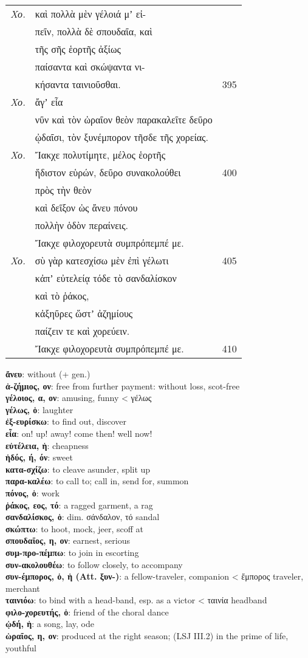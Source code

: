 \documentclass[13pt]{article}
\newcommand{\vocabentry}[2]{\textbf{#1}: #2\vspace{0.0em}\\}
\begin{document}
\begin{greek}
\newpage
\begin{spacing}{1.5}
\begin{tabularx}{\textwidth}{@{}lXr@{}}
\textit{Χο.} & καὶ πολλὰ μὲν γέλοιά μʼ εἰ- &  \\
& πεῖν, πολλὰ δὲ σπουδαῖα, καὶ &  \\
& τῆς σῆς ἑορτῆς ἀξίως &  \\
& παίσαντα καὶ σκώψαντα νι- &  \\
& κήσαντα ταινιοῦσθαι. & 395 \\
\textit{Χο.} & ἄγʼ εἶα &  \\
& νῦν καὶ τὸν ὡραῖον θεὸν παρακαλεῖτε δεῦρο &  \\
& ᾠδαῖσι, τὸν ξυνέμπορον τῆσδε τῆς χορείας. &  \\
\textit{Χο.} & Ἴακχε πολυτίμητε, μέλος ἑορτῆς &  \\
& ἥδιστον εὑρών, δεῦρο συνακολούθει & 400 \\
& πρὸς τὴν θεὸν &  \\
& καὶ δεῖξον ὡς ἄνευ πόνου &  \\
& πολλὴν ὁδὸν περαίνεις. &  \\
& Ἴακχε φιλοχορευτὰ συμπρόπεμπέ με. &  \\
\textit{Χο.} & σὺ γὰρ κατεσχίσω μὲν ἐπὶ γέλωτι & 405 \\
& κἀπʼ εὐτελείᾳ τόδε τὸ σανδαλίσκον &  \\
& καὶ τὸ ῥάκος, &  \\
& κἀξηῦρες ὥστʼ ἀζημίους &  \\
& παίζειν τε καὶ χορεύειν. &  \\
& Ἴακχε φιλοχορευτὰ συμπρόπεμπέ με. & 410 \\

\end{tabularx}
\end{spacing}

\newpage
\begin{multicols}{2}
\small %
\vocabentry{ἄνευ}{without (+ gen.)}
\vocabentry{ἀ-ζήμιος, ον}{free from further payment: without loss, scot-free}
\vocabentry{γέλοιος, α, ον}{amusing, funny < γέλως}
\vocabentry{γέλως, ὁ}{laughter}
\vocabentry{ἐξ-ευρίσκω}{to find out, discover}
\vocabentry{εἶα}{on! up! away! come then! well now!}
\vocabentry{εὐτέλεια, ἡ}{cheapness}
\vocabentry{ἡδύς, ή, όν}{sweet}
\vocabentry{κατα-σχίζω}{to cleave asunder, split up}
\vocabentry{παρα-καλέω}{to call to; call in, send for, summon}
\vocabentry{πόνος, ὁ}{work}
\vocabentry{ῥάκος, εος, τό}{a ragged garment, a rag}
\vocabentry{σανδαλίσκος, ὁ}{dim. σάνδαλον, τό sandal}
\vocabentry{σκώπτω}{to hoot, mock, jeer, scoff at}
\vocabentry{σπουδαῖος, η, ον}{earnest, serious}
\vocabentry{συμ-προ-πέμπω}{to join in escorting}
\vocabentry{συν-ακολουθέω}{to follow closely, to accompany}
\vocabentry{συν-έμπορος, ὁ, ἡ (Att. ξυν-)}{a fellow-traveler, companion < ἔμπορος traveler, merchant}
\vocabentry{ταινιόω}{to bind with a head-band, esp. as a victor < ταινία headband}
\vocabentry{φιλο-χορευτής, ὁ}{friend of the choral dance}
\vocabentry{ᾠδή, ἡ}{a song, lay, ode}
\vocabentry{ὡραῖος, η, ον}{produced at the right season; (LSJ III.2) in the prime of life, youthful}
\end{multicols}


\end{greek}
\end{document}
